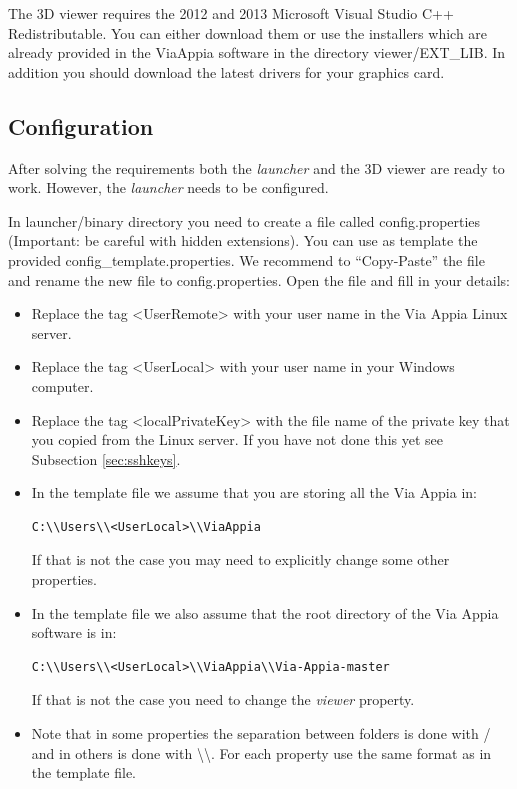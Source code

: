 \documentclass[a4paper,11pt]{article}
\begin{document}
The 3D viewer requires the 2012 and 2013 Microsoft Visual Studio C++ Redistributable. You can either download them or use the installers which are already provided in the ViaAppia software in the directory viewer/EXT\_LIB. In addition you should download the latest drivers for your graphics card.

\subsection{Configuration}

After solving the requirements both the \textit{launcher} and the 3D viewer are ready to work. However, the \textit{launcher} needs to be configured.

In launcher/binary directory you need to create a file called config.properties (Important: be careful with hidden extensions). You can use as template the provided config\_template.properties. We recommend to ``Copy-Paste'' the file and rename the new file to config.properties. Open the file and fill in your details:

\begin{itemize}
\item Replace the tag \textless{}UserRemote\textgreater{} with your user name in the Via Appia Linux server.
\item Replace the tag \textless{}UserLocal\textgreater{} with your user name in your Windows computer.
\item Replace the tag \textless{}localPrivateKey\textgreater{} with the file name of the private key that you copied from the Linux server. If you have not done this yet see Subsection \ref{sec:sshkeys}.
\item In the template file we assume that you are storing all the Via Appia in:
\begin{verbatim}
C:\\Users\\<UserLocal>\\ViaAppia
\end{verbatim}
If that is not the case you may need to explicitly change some other properties.
\item In the template file we also assume that the root directory of the Via Appia software is in:
\begin{verbatim}
C:\\Users\\<UserLocal>\\ViaAppia\\Via-Appia-master
\end{verbatim}
If that is not the case you need to change the \textit{viewer} property.
\item Note that in some properties the separation between folders is done with / and in others is done with \textbackslash{}\textbackslash{}. For each property use the same format as in the template file.
\end{itemize}
\end{document}
